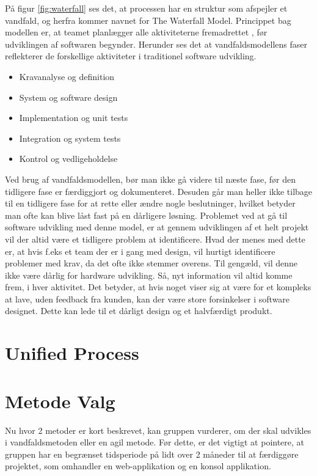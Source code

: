 På figur \ref{fig:waterfall} ses det, at processen har en struktur som afspejler et vandfald, og herfra kommer navnet for The Waterfall Model. Princippet bag modellen er, at teamet planlægger alle aktiviteterne fremadrettet , før udviklingen af softwaren begynder. Herunder ses det at vandfaldsmodellens faser reflekterer de forskellige aktiviteter i traditionel software udvikling.\cite{Sommerville} 
\begin{itemize}
    \item Kravanalyse og definition
    \item System og software design
    \item Implementation og unit tests
    \item Integration og system tests
    \item Kontrol og vedligeholdelse 
\end{itemize}

Ved brug af vandfaldsmodellen, bør man ikke gå videre til næste fase, før den tidligere fase er færdiggjort og dokumenteret. Desuden går man heller ikke tilbage til en tidligere fase for at rette eller ændre nogle beslutninger, hvilket betyder man ofte kan blive låst fast på en dårligere løsning. Problemet ved at gå til software udvikling med denne model, er at gennem udviklingen af et helt projekt vil der altid være et tidligere problem at identificere. Hvad der menes med dette er, at hvis f.eks et team der er i gang med design, vil hurtigt identificere problemer med krav, da det ofte ikke stemmer overens. Til gengæld, vil denne ikke være dårlig for hardware udvikling. Så, nyt information vil altid komme frem, i hver aktivitet. Det betyder, at hvis noget viser sig at være for et kompleks at lave, uden feedback fra kunden, kan der være store forsinkelser i software designet. Dette kan lede til et dårligt design og et halvfærdigt produkt.\cite{Sommerville} 

\section{Unified Process}

\section{Metode Valg}

Nu hvor 2 metoder er kort beskrevet, kan gruppen vurderer, om der skal udvikles i vandfaldsmetoden eller en agil metode. Før dette, er det vigtigt at pointere, at gruppen har en begrænset tidsperiode på lidt over 2 måneder til at færdiggøre projektet, som omhandler en web-applikation og en konsol applikation.

